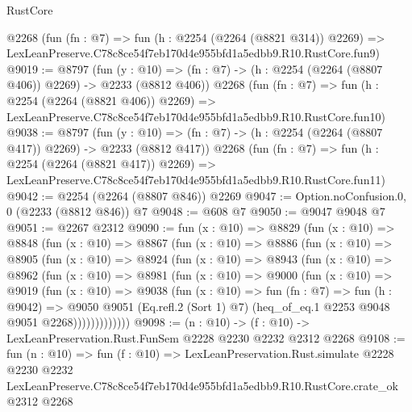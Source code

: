 \begin{lexlean}{RustCore}
\begin{coremodule}
    @2268
    (fun (fn : @7) =>
    fun (h : @2254 (@2264 (@8821 @314)) @2269) =>
    LexLeanPreserve.C78c8ce54f7eb170d4e955bfd1a5edbb9.R10.RustCore.fun9)
@9019 := @8797
    (fun (y : @10) => (fn : @7) -> (h : @2254 (@2264 (@8807 @406)) @2269) -> @2233 (@8812 @406))
    @2268
    (fun (fn : @7) =>
    fun (h : @2254 (@2264 (@8821 @406)) @2269) =>
    LexLeanPreserve.C78c8ce54f7eb170d4e955bfd1a5edbb9.R10.RustCore.fun10)
@9038 := @8797
    (fun (y : @10) => (fn : @7) -> (h : @2254 (@2264 (@8807 @417)) @2269) -> @2233 (@8812 @417))
    @2268
    (fun (fn : @7) =>
    fun (h : @2254 (@2264 (@8821 @417)) @2269) =>
    LexLeanPreserve.C78c8ce54f7eb170d4e955bfd1a5edbb9.R10.RustCore.fun11)
@9042 := @2254 (@2264 (@8807 @846)) @2269
@9047 := Option.noConfusion.{0, 0} (@2233 (@8812 @846)) @7
@9048 := @608 @7
@9050 := @9047 @9048 @7
@9051 := @2267 @2312
@9090 := fun (x : @10) =>
  @8829
    (fun (x : @10) =>
    @8848
      (fun (x : @10) =>
      @8867
        (fun (x : @10) =>
        @8886
          (fun (x : @10) =>
          @8905
            (fun (x : @10) =>
            @8924
              (fun (x : @10) =>
              @8943
                (fun (x : @10) =>
                @8962
                  (fun (x : @10) =>
                  @8981
                    (fun (x : @10) =>
                    @9000
                      (fun (x : @10) =>
                      @9019
                        (fun (x : @10) =>
                        @9038
                          (fun (x : @10) =>
                          fun (fn : @7) =>
                          fun (h : @9042) =>
                          @9050
                            @9051
                            (Eq.refl.{2} (Sort 1) @7)
                            (heq_of_eq.{1} @2253 @9048 @9051 @2268)))))))))))))
@9098 := (n : @10) -> (f : @10) -> LexLeanPreservation.Rust.FunSem @2228 @2230 @2232 @2312 @2268
@9108 := fun (n : @10) =>
  fun (f : @10) =>
  LexLeanPreservation.Rust.simulate
    @2228
    @2230
    @2232
    LexLeanPreserve.C78c8ce54f7eb170d4e955bfd1a5edbb9.R10.RustCore.crate_ok
    @2312
    @2268
\end{coremodule}
\end{lexlean}
